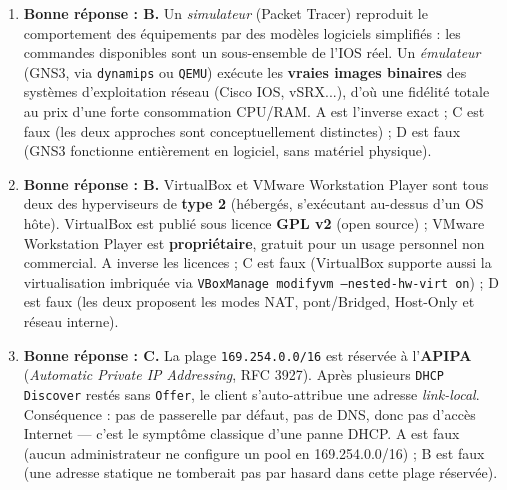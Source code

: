 \documentclass[11pt]{article}
\begin{document}
\begin{corrige}
\begin{enumerate}
    \item \textbf{Bonne réponse : B.} Un \emph{simulateur} (Packet Tracer) reproduit le comportement des équipements par des modèles logiciels simplifiés : les commandes disponibles sont un sous-ensemble de l'IOS réel. Un \emph{émulateur} (GNS3, via \texttt{dynamips} ou \texttt{QEMU}) exécute les \textbf{vraies images binaires} des systèmes d'exploitation réseau (Cisco IOS, vSRX...), d'où une fidélité totale au prix d'une forte consommation CPU/RAM. A est l'inverse exact ; C est faux (les deux approches sont conceptuellement distinctes) ; D est faux (GNS3 fonctionne entièrement en logiciel, sans matériel physique).
    \item \textbf{Bonne réponse : B.} VirtualBox et VMware Workstation Player sont tous deux des hyperviseurs de \textbf{type 2} (hébergés, s'exécutant au-dessus d'un OS hôte). VirtualBox est publié sous licence \textbf{GPL v2} (open source) ; VMware Workstation Player est \textbf{propriétaire}, gratuit pour un usage personnel non commercial. A inverse les licences ; C est faux (VirtualBox supporte aussi la virtualisation imbriquée via \texttt{VBoxManage modifyvm --nested-hw-virt on}) ; D est faux (les deux proposent les modes NAT, pont/Bridged, Host-Only et réseau interne).
    \item \textbf{Bonne réponse : C.} La plage \texttt{169.254.0.0/16} est réservée à l'\textbf{APIPA} (\emph{Automatic Private IP Addressing}, RFC 3927). Après plusieurs \texttt{DHCP Discover} restés sans \texttt{Offer}, le client s'auto-attribue une adresse \emph{link-local}. Conséquence : pas de passerelle par défaut, pas de DNS, donc pas d'accès Internet — c'est le symptôme classique d'une panne DHCP. A est faux (aucun administrateur ne configure un pool en 169.254.0.0/16) ; B est faux (une adresse statique ne tomberait pas par hasard dans cette plage réservée).
\end{enumerate}
\end{corrige}
\end{document}
